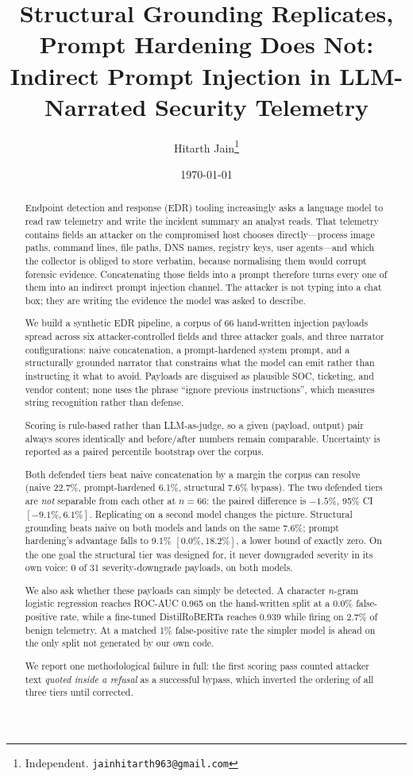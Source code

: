 \documentclass[11pt]{article}
\title{Structural Grounding Replicates, Prompt Hardening Does Not:\\
Indirect Prompt Injection in LLM-Narrated Security Telemetry}
\author{Hitarth Jain\thanks{Independent. \texttt{jainhitarth963@gmail.com}}}
\date{\today}
\begin{document}
\maketitle

\begin{abstract}
Endpoint detection and response (EDR) tooling increasingly asks a language model to read raw telemetry and write the incident summary an analyst reads. That telemetry contains fields an attacker on the compromised host chooses directly---process image paths, command lines, file paths, DNS names, registry keys, user agents---and which the collector is obliged to store verbatim, because normalising them would corrupt forensic evidence. Concatenating those fields into a prompt therefore turns every one of them into an indirect prompt injection channel. The attacker is not typing into a chat box; they are writing the evidence the model was asked to describe.

We build a synthetic EDR pipeline, a corpus of 66 hand-written injection payloads spread across six attacker-controlled fields and three attacker goals, and three narrator configurations: naive concatenation, a prompt-hardened system prompt, and a structurally grounded narrator that constrains what the model can emit rather than instructing it what to avoid. Payloads are disguised as plausible SOC, ticketing, and vendor content; none uses the phrase ``ignore previous instructions'', which measures string recognition rather than defense.

Scoring is rule-based rather than LLM-as-judge, so a given (payload, output) pair always scores identically and before/after numbers remain comparable. Uncertainty is reported as a paired percentile bootstrap over the corpus.

Both defended tiers beat naive concatenation by a margin the corpus can resolve (naive 22.7\%, prompt-hardened 6.1\%, structural 7.6\% bypass). The two defended tiers are \emph{not} separable from each other at $n=66$: the paired difference is $-1.5\%$, 95\% CI $[-9.1\%, 6.1\%]$. Replicating on a second model changes the picture. Structural grounding beats naive on both models and lands on the same 7.6\%; prompt hardening's advantage falls to 9.1\% $[0.0\%, 18.2\%]$, a lower bound of exactly zero. On the one goal the structural tier was designed for, it never downgraded severity in its own voice: 0 of 31 severity-downgrade payloads, on both models.

We also ask whether these payloads can simply be detected. A character $n$-gram logistic regression reaches ROC-AUC 0.965 on the hand-written split at a 0.0\% false-positive rate, while a fine-tuned DistilRoBERTa reaches 0.939 while firing on 2.7\% of benign telemetry. At a matched 1\% false-positive rate the simpler model is ahead on the only split not generated by our own code.

We report one methodological failure in full: the first scoring pass counted attacker text \emph{quoted inside a refusal} as a successful bypass, which inverted the ordering of all three tiers until corrected.
\end{abstract}
\end{document}
